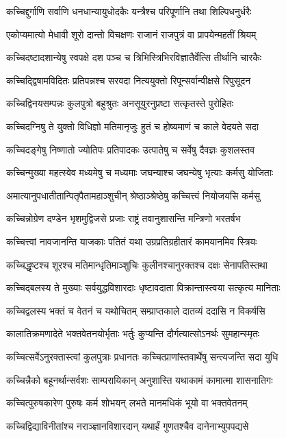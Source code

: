\twolineshloka
{कच्चिद्दुर्गाणि सर्वाणि धनधान्यायुधोदकैः}
{यन्त्रैश्च परिपूर्णानि तथा शिल्पिधनुर्धरैः}


\twolineshloka
{एकोप्यमात्यो मेधावी शूरो दान्तो विचक्षणः}
{राजानं राजपुत्रं वा प्रापयेन्महतीं श्रियम्}


\twolineshloka
{कच्चिदष्टादशान्येषु स्वपक्षे दश पञ्च च}
{त्रिभिस्त्रिभिरविज्ञातैर्वेत्सि तीर्थानि चारकैः}


\twolineshloka
{कच्चिद्द्विषामविदितः प्रतिपन्नश्च सरवदा}
{नित्ययुक्तो रिपून्सर्वान्वीक्षसे रिपुसूदन}


\twolineshloka
{कच्चिद्विनयसम्पन्नः कुलपुत्रो बहुश्रुतः}
{अनसूयुरनुप्रष्टा सत्कृतस्ते पुरोहितः}


\twolineshloka
{कच्चिदग्निषु ते युक्तो विधिज्ञो मतिमानृजुः}
{हुतं च होष्यमाणं च काले वेदयते सदा}


\twolineshloka
{कच्चिदङ्गेषु निष्णातो ज्योतिपः प्रतिपादकः}
{उत्पातेषु च सर्वेषु दैवज्ञः कुशलस्तव}


\twolineshloka
{कच्चिन्मुख्या महत्स्वेव मध्यमेषु च मध्यमाः}
{जघन्याश्च जघन्येषु भृत्याः कर्मसु योजिताः}


\twolineshloka
{अमात्यानुपधातीतान्पितृपैतामहाञ्शुचीन्}
{श्रेष्ठाञ्श्रेष्ठेषु कच्चित्त्वं नियोजयसि कर्मसु}


\twolineshloka
{कच्चिन्नोग्रेण दण्डेन भृशमुद्विजसे प्रजाः}
{राष्ट्रं तवानुशासन्ति मन्त्रिणो भरतर्षभ}


\twolineshloka
{कच्चित्त्वां नावजानन्ति याजकाः पतितं यथा}
{उग्रप्रतिग्रहीतारं कामयानमिव स्त्रियः}


\threelineshloka
{कच्चिद्धृष्टश्च शूरश्च मतिमान्धृतिमाञ्शुचिः}
{कुलीनश्चानुरक्तश्च दक्षः सेनापतिस्तथा}
{}


\twolineshloka
{कच्चिद्बलस्य ते मुख्याः सर्वयुद्धविशारदाः}
{धृष्टावदाता विक्रान्तास्त्वया सत्कृत्य मानिताः}


\twolineshloka
{कच्चिद्वलस्य भक्तं च वेतनं च यथोचितम्}
{सम्प्राप्तकाले दातव्यं ददासि न विकर्षसि}


\twolineshloka
{कालातिक्रमणादेते भक्तवेतनयोर्भृताः}
{भर्तुः कुप्यन्ति दौर्गत्यात्सोऽनर्थः सुमहान्स्मृतः}


\twolineshloka
{कच्चित्सर्वेऽनुरक्तास्त्वां कुलपुत्राः प्रधानतः}
{कच्चित्प्राणांस्तवार्थेषु सन्त्यजन्ति सदा युधि}


\twolineshloka
{कच्चिन्नैको बहूनर्थान्सर्वशः साम्परायिकान्}
{अनुशास्ति यथाकामं कामात्मा शासनातिगः}


\twolineshloka
{कच्चित्पुरुषकारेण पुरुषः कर्म शोभयन्}
{लभते मानमधिकं भूयो वा भक्तवेतनम्}


\twolineshloka
{कच्चिद्विद्याविनीतांश्च नराञ्ज्ञानविशारदान्}
{यथार्हं गुणतश्चैव दानेनाभ्युपपद्यसे}


